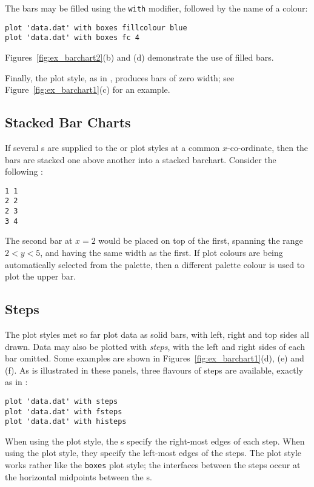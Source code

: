 The bars may be filled using the {\tt with}  modifier,
followed by the name of a colour:

\begin{verbatim} 
plot 'data.dat' with boxes fillcolour blue
plot 'data.dat' with boxes fc 4
\end{verbatim}

\noindent Figures~\ref{fig:ex_barchart2}(b) and (d) demonstrate the use of
filled bars.

Finally, the  plot style, as in \gnuplot, produces bars of zero
width; see Figure~\ref{fig:ex_barchart1}(c) for an example.

\subsection{Stacked Bar Charts}

If several \datapoint s are supplied to the  or 
plot styles at a common $x$-co-ordinate, then the bars are stacked one above
another into a stacked barchart. Consider the following \datafile:

\begin{verbatim} 
1 1
2 2
2 3
3 4
\end{verbatim}

\noindent The second bar at $x=2$ would be placed on top of the first, spanning
the range $2<y<5$, and having the same width as the first. If plot colours are
being automatically selected from the palette, then a different palette colour
is used to plot the upper bar.

\subsection{Steps}

The plot styles met so far plot data as solid bars, with left, right and top
sides all drawn. Data may also be plotted with {\it steps}, with the left and
right sides of each bar omitted. Some examples are shown in
Figures~\ref{fig:ex_barchart1}(d), (e) and (f).  As is illustrated in these
panels, three flavours of steps are available, exactly as in \gnuplot:

\begin{verbatim}
plot 'data.dat' with steps 
plot 'data.dat' with fsteps 
plot 'data.dat' with histeps
\end{verbatim}

\noindent When using the  plot style, the \datapoint s specify the
right-most edges of each step. When using the  plot style, they
specify the left-most edges of the steps. The  plot style works
rather like the {\tt boxes} plot style; the interfaces between the steps occur
at the horizontal midpoints between the \datapoint s.

